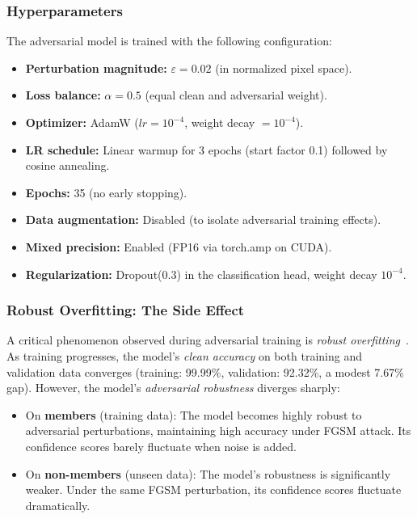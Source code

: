 \documentclass[conference]{IEEEtran}
\begin{document}
\subsubsection{Hyperparameters}
The adversarial model is trained with the following configuration:
\begin{itemize}[leftmargin=*]
    \item \textbf{Perturbation magnitude:} $\varepsilon = 0.02$ (in normalized pixel space).
    \item \textbf{Loss balance:} $\alpha = 0.5$ (equal clean and adversarial weight).
    \item \textbf{Optimizer:} AdamW ($lr = 10^{-4}$, weight decay $= 10^{-4}$).
    \item \textbf{LR schedule:} Linear warmup for 3 epochs (start factor 0.1) followed by cosine annealing.
    \item \textbf{Epochs:} 35 (no early stopping).
    \item \textbf{Data augmentation:} Disabled (to isolate adversarial training effects).
    \item \textbf{Mixed precision:} Enabled (FP16 via torch.amp on CUDA).
    \item \textbf{Regularization:} Dropout(0.3) in the classification head, weight decay $10^{-4}$.
\end{itemize}

\subsubsection{Robust Overfitting: The Side Effect}
\label{sec:robust_overfitting}

A critical phenomenon observed during adversarial training is \textit{robust overfitting}~\cite{rice2020overfitting}. As training progresses, the model's \textit{clean accuracy} on both training and validation data converges (training: 99.99\%, validation: 92.32\%, a modest 7.67\% gap). However, the model's \textit{adversarial robustness} diverges sharply:

\begin{itemize}[leftmargin=*]
    \item On \textbf{members} (training data): The model becomes highly robust to adversarial perturbations, maintaining high accuracy under FGSM attack. Its confidence scores barely fluctuate when noise is added.
    
    \item On \textbf{non-members} (unseen data): The model's robustness is significantly weaker. Under the same FGSM perturbation, its confidence scores fluctuate dramatically.
\end{itemize}
\end{document}

